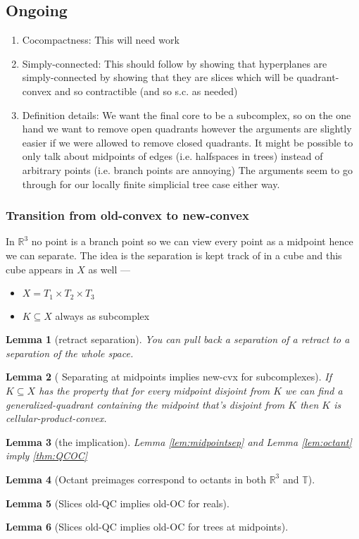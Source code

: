 \documentclass{article}
\theoremstyle{mystyle}
\newtheorem{lem}{Lemma}[section]
\theoremstyle{remark}
\begin{document}
\subsection{Ongoing}
\begin{enumerate}
    \item Cocompactness: This will need work
    \item Simply-connected: This should follow by showing that hyperplanes are simply-connected by showing that they are slices which will be quadrant-convex and so contractible (and so s.c. as needed)
    \item Definition details: We want the final core to be a subcomplex, so on the one hand we want to remove open quadrants however the arguments are slightly easier if we were allowed to remove closed quadrants. It might be possible to only talk about midpoints of edges (i.e. halfspaces in trees) instead of arbitrary points (i.e. branch points are annoying) The arguments seem to go through for our locally finite simplicial tree case either way. 
\end{enumerate}

\subsubsection{Transition from old-convex to new-convex}

In \(\mathbb{R}^{3} \) no point is a branch point so we can view every point as a midpoint hence we can separate. The idea is the separation is kept track of in a cube and this cube appears in \(X\) as well --- 

\begin{itemize}
	\item \(X=T_{1} \times T_{2} \times T_{3}\)
	\item \(K \subseteq X\) always as subcomplex
\end{itemize}

\begin{lem}
    [retract separation]
    You can pull back a separation of a retract to a separation of the whole space.
\end{lem}
\begin{lem}
	[\label{lem:midpointsep} Separating at midpoints implies new-cvx for subcomplexes]
	If \(K \subseteq X \) has the property that for every midpoint disjoint from \(K\) we can find a generalized-quadrant containing the midpoint that's disjoint from \(K\) then \(K\) is cellular-product-convex.
\end{lem}
\begin{lem}
	[the implication]
	Lemma \ref{lem:midpointsep} and Lemma \ref{lem:octant} imply \ref{thm:QCOC}
\end{lem}
\begin{lem}
	[\label{lem:octant}Octant preimages correspond to octants in both \(\mathbb{R}^3\) and \(\mathbb{T}\)]
\end{lem}
\begin{lem}
    [Slices old-QC implies old-OC for reals]


\end{lem}
\begin{lem}
    [Slices old-QC implies old-OC for trees at midpoints]
\end{lem}
\end{document}
